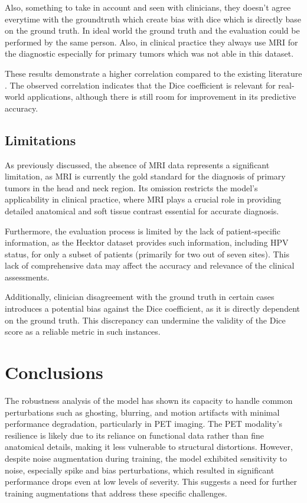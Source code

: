 Also, something to take in account and seen with clinicians, they doesn't agree everytime with the groundtruth which create bias with dice which is directly base on the ground truth. In ideal
world the ground truth and the evaluation could be performed by the same person. Also, in clinical practice they always use MRI for the diagnostic especially for primary tumors which was not able in this dataset.

These results demonstrate a higher correlation compared to the existing literature \cite{Kofler2023}. The observed correlation indicates that the Dice coefficient is relevant for real-world applications, although there is still room for improvement in its predictive accuracy.

\subsection{Limitations}
As previously discussed, the absence of MRI data represents a significant limitation, as MRI is currently the gold standard for the diagnosis of primary tumors in the head and neck region. Its omission restricts the model's applicability in clinical practice, where MRI plays a crucial role in providing detailed anatomical and soft tissue contrast essential for accurate diagnosis.

Furthermore, the evaluation process is limited by the lack of patient-specific information, as the Hecktor dataset provides such information, including HPV status, for only a subset of patients (primarily for two out of seven sites). This lack of comprehensive data may affect the accuracy and relevance of the clinical assessments.

Additionally, clinician disagreement with the ground truth in certain cases introduces a potential bias against the Dice coefficient, as it is directly dependent on the ground truth. This discrepancy can undermine the validity of the Dice score as a reliable metric in such instances.

\newpage
\section{Conclusions}

The robustness analysis of the model has shown its capacity to handle common perturbations such as ghosting, blurring, and motion artifacts with minimal performance degradation, particularly in PET imaging. The PET modality’s resilience is likely due to its reliance on functional data rather than fine anatomical details, making it less vulnerable to structural distortions. However, despite noise augmentation during training, the model exhibited sensitivity to noise, especially spike and bias perturbations, which resulted in significant performance drops even at low levels of severity. This suggests a need for further training augmentations that address these specific challenges.

